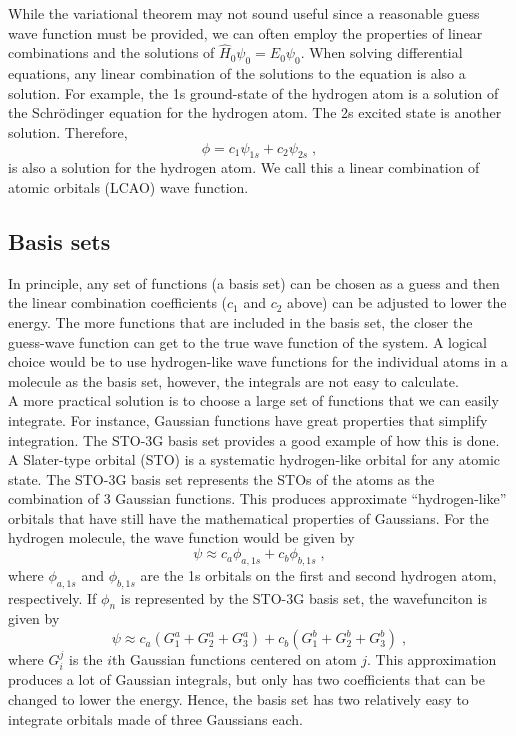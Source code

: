 \documentclass[12pt]{report}
\begin{document}
While the variational theorem may not sound useful since a reasonable guess
wave function must be provided, we can often employ the properties of linear
combinations and the solutions of $\hat H_0\psi_0=E_0\psi_0$.
When solving differential equations, any linear combination of the solutions
to the equation is also a solution.
For example, the 1s ground-state of the hydrogen atom is a solution of the
Schr\"{o}dinger equation for the hydrogen atom.
The 2s excited state is another solution.
Therefore,
\begin{equation}
 \phi = c_1\psi_{1s}+c_2\psi_{2s} \; ,
\end{equation}
is also a solution for the hydrogen atom.
We call this a linear combination of atomic orbitals (LCAO) wave function.

\subsection{Basis sets}

In principle, any set of functions (a basis set) can be chosen as a guess and
then the linear combination coefficients ($c_1$ and $c_2$ above) can be
adjusted to lower the energy.
The more functions that are included in the basis set, the closer the
guess-wave function can get to the true wave function of the system.
A logical choice would be to use hydrogen-like wave functions for the
individual atoms in a molecule as the basis set, however, the integrals are
not easy to calculate. \\

A more practical solution is to choose a large set of functions that we can
easily integrate.
For instance, Gaussian functions have great properties that simplify
integration.
The STO-3G basis set provides a good example of how this is done.
A Slater-type orbital (STO) is a systematic hydrogen-like orbital for any
atomic state.
The STO-3G basis set represents the STOs of the atoms as the combination of 3
Gaussian functions.
This produces approximate ``hydrogen-like'' orbitals that have still have the
mathematical properties of Gaussians.
For the hydrogen molecule, the wave function would be given by
\begin{equation}
 \psi \approx c_a\phi_{a,1s}+c_b\phi_{b,1s} \; ,
\end{equation}
where $\phi_{a,1s}$ and $\phi_{b,1s}$ are the 1s orbitals on the first and
second hydrogen atom, respectively.
If $\phi_n$ is represented by the STO-3G basis set, the wavefunciton is given
by
\begin{equation}
 \psi \approx c_a(G^a_1+G^a_2+G^a_3)+c_b(G^b_1+G^b_2+G^b_3) \; ,
\end{equation}
where $G^j_i$ is the $i$th Gaussian functions centered on atom $j$.
This approximation produces a lot of Gaussian integrals, but only has two
coefficients that can be changed to lower the energy.
Hence, the basis set has two relatively easy to integrate orbitals made of
three Gaussians each. \\
\end{document}
